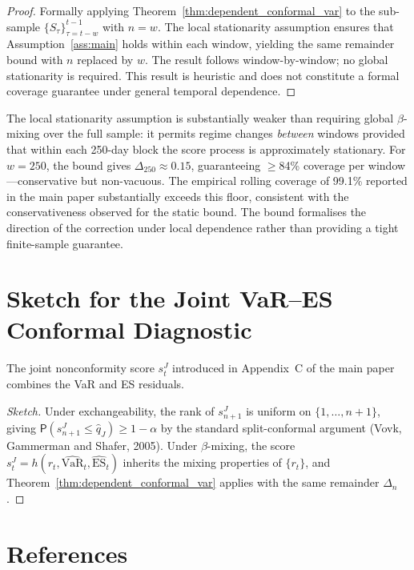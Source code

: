 \documentclass[11pt]{article}
\newcommand{\VaR}{\mathrm{VaR}}
\newcommand{\ES}{\mathrm{ES}}
\renewcommand{\P}{\mathsf{P}}
\begin{document}
\begin{proof}
Formally applying Theorem~\ref{thm:dependent_conformal_var} to
the sub-sample $\{S_\tau\}_{\tau=t-w}^{t-1}$ with $n = w$. The
local stationarity assumption ensures that
Assumption~\ref{ass:main} holds within each window, yielding the
same remainder bound with $n$ replaced by $w$. The result
follows window-by-window; no global stationarity is required.
This result is heuristic and does not constitute a formal
coverage guarantee under general temporal dependence.
\end{proof}

The local stationarity assumption is substantially weaker than
requiring global $\beta$-mixing over the full sample: it permits
regime changes \emph{between} windows provided that within each
250-day block the score process is approximately stationary. For
$w = 250$, the bound gives $\Delta_{250} \approx 0.15$,
guaranteeing $\geq$84\% coverage per window---conservative but
non-vacuous. The empirical rolling coverage of 99.1\% reported in
the main paper substantially exceeds this floor, consistent with
the conservativeness observed for the static bound. The bound
formalises the direction of the correction under local
dependence rather than providing a tight finite-sample guarantee.

\section{Sketch for the Joint VaR--ES Conformal Diagnostic}

The joint nonconformity score $s_t^J$ introduced in Appendix~C
of the main paper combines the VaR and ES residuals.

\begin{proof}[Sketch]
Under exchangeability, the rank of $s_{n+1}^J$ is uniform on
$\{1,\ldots,n+1\}$, giving
$\P(s_{n+1}^J \le \hat{q}_J) \geq 1 - \alpha$ by the standard
split-conformal argument (Vovk, Gammerman and Shafer, 2005).
Under $\beta$-mixing, the score
$s_t^J = h(r_t, \widehat{\VaR}_t, \widehat{\ES}_t)$ inherits the
mixing properties of $\{r_t\}$, and
Theorem~\ref{thm:dependent_conformal_var} applies with the same
remainder $\Delta_n$.
\end{proof}

\section*{References}
\end{document}
